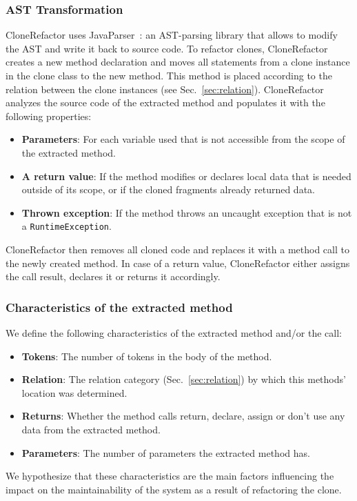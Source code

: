 \documentclass[sigconf,review, table]{acmart}
\begin{document}
\subsubsection{AST Transformation}
CloneRefactor uses JavaParser~\cite{smith2017javaparser}: an AST-parsing library that allows to modify the AST and write it back to source code. To refactor clones, CloneRefactor creates a new method declaration and moves all statements from a clone instance in the clone class to the new method. This method is placed according to the relation between the clone instances (see Sec.~\ref{sec:relation}). CloneRefactor analyzes the source code of the extracted method and populates it with the following properties:
\begin{itemize}
  \item \textbf{Parameters}: For each variable used that is not accessible from the scope of the extracted method.
  \item \textbf{A return value}: If the method modifies or declares local data that is needed outside of its scope, or if the cloned fragments already returned data.
  \item \textbf{Thrown exception}: If the method throws an uncaught exception that is not a \texttt{RuntimeException}.
\end{itemize}
CloneRefactor then removes all cloned code and replaces it with a method call to the newly created method. In case of a return value, CloneRefactor either assigns the call result, declares it or returns it accordingly.

\subsubsection{Characteristics of the extracted method}\label{sec:characteristics}
We define the following characteristics of the extracted method and/or the call:
\begin{itemize}
\item \textbf{Tokens}: The number of tokens in the body of the method.
\item \textbf{Relation}: The relation category (Sec.~\ref{sec:relation}) by which this methods' location was determined.
\item \textbf{Returns}: Whether the method calls return, declare, assign or don't use any data from the extracted method.
\item \textbf{Parameters}: The number of parameters the extracted method has.
\end{itemize}
We hypothesize that these characteristics are the main factors influencing the impact on the maintainability of the system as a result of refactoring the clone.
\end{document}
